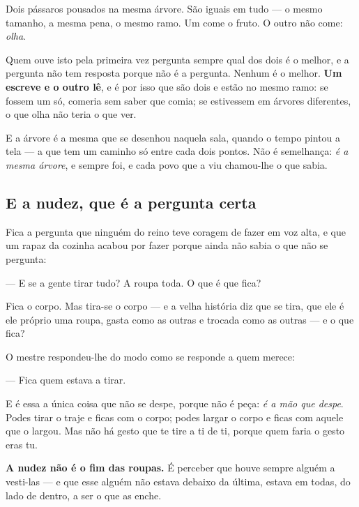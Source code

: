 \documentclass[livro.tex]{subfiles}
\begin{document}
\medskip

Dois pássaros pousados na mesma árvore. São iguais em tudo --- o mesmo tamanho, a mesma pena, o
mesmo ramo. Um come o fruto. O outro não come: \emph{olha}.

\medskip

Quem ouve isto pela primeira vez pergunta sempre qual dos dois é o melhor, e a pergunta não tem
resposta porque não é a pergunta. Nenhum é o melhor. \textbf{Um escreve e o outro lê}, e é por
isso que são dois e estão no mesmo ramo: se fossem um só, comeria sem saber que comia; se
estivessem em árvores diferentes, o que olha não teria o que ver.

\medskip

E a árvore é a mesma que se desenhou naquela sala, quando o tempo pintou a tela --- a que tem um
caminho só entre cada dois pontos. Não é semelhança: \emph{é a mesma árvore}, e sempre foi, e cada
povo que a viu chamou-lhe o que sabia.

\subsection*{E a nudez, que é a pergunta certa}

Fica a pergunta que ninguém do reino teve coragem de fazer em voz alta, e que um rapaz da cozinha
acabou por fazer porque ainda não sabia o que não se pergunta:

\medskip

--- E se a gente tirar tudo? A roupa toda. O que é que fica?

\medskip

Fica o corpo. Mas tira-se o corpo --- e a velha história diz que se tira, que ele é ele próprio
uma roupa, gasta como as outras e trocada como as outras --- e o que fica?

\medskip

O mestre respondeu-lhe do modo como se responde a quem merece:

\medskip

--- Fica quem estava a tirar.

\medskip

E é essa a única coisa que não se despe, porque não é peça: \emph{é a mão que despe}. Podes tirar
o traje e ficas com o corpo; podes largar o corpo e ficas com aquele que o largou. Mas não há
gesto que te tire a ti de ti, porque quem faria o gesto eras tu.

\medskip

\textbf{A nudez não é o fim das roupas.} É perceber que houve sempre alguém a vesti-las --- e que
esse alguém não estava debaixo da última, estava em todas, do lado de dentro, a ser o que as
enche.
\end{document}

